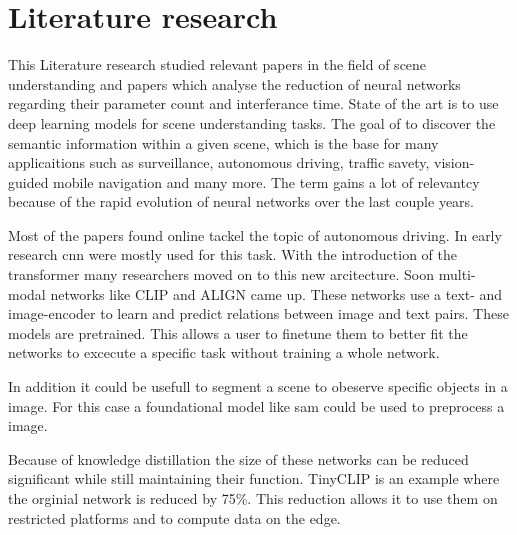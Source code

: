\chapter{Literature research}

This Literature research studied relevant papers in the field of scene understanding
and papers which analyse the reduction of neural networks regarding their parameter count and interferance time.
State of the art is to use deep learning models for scene understanding tasks.
The goal of to discover the semantic information within a given scene, which is the base for many applicaitions such as surveillance, autonomous driving, traffic savety, vision-guided mobile navigation and many more.
The term gains a lot of relevantcy because of the rapid evolution of neural networks over the last couple years.

Most of the papers found online tackel the topic of autonomous driving\cite{sceneunderstandingautdriving1}.
In early research \acrfull{cnn}\cite{SegNet} were mostly used for this task.
With the introduction of the transformer \cite{attentionisallyouneed} many researchers moved on to this new arcitecture.
Soon multi-modal networks like CLIP\cite{clip} and ALIGN\cite{ALIGN} came up.
These networks use a text- and image-encoder to learn and predict relations between image and text pairs.
These models are pretrained.
This allows a user to finetune them to better fit the networks to excecute a specific task without training a whole network.

In addition it could be usefull to segment a scene to obeserve specific objects in a image.
For this case a foundational model like \Acrfull{sam}\cite{sam} could be used to preprocess a image.

Because of knowledge distillation\cite{knowledgedistillation} the size of these networks can be reduced significant while still maintaining their function.
TinyCLIP\cite{tinyclip} is an example where the orginial network is reduced by 75\%.
This reduction allows it to use them on restricted platforms and to compute data on the edge.

